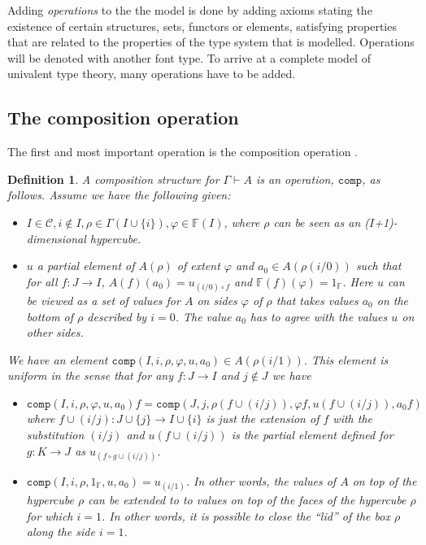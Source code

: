 \documentclass[11pt,a4paper,twoside,xetex,draft]{book}
\newcommand{\keyword}[1]{\emph{#1}\index{#1}}
\newtheorem{definition}[theorem]{Definition}
\newcommand{\op}[1]{\mathtt{#1}}
\begin{document}
Adding \keyword{operations} to the the model is done by adding axioms stating the existence of certain structures, sets, functors or elements, satisfying properties that are related to the properties of the type system that is modelled. Operations will be denoted with another font type. To arrive at a complete model of univalent type theory, many operations have to be added. 

\subsection{The composition operation}

The first and most important operation is the composition operation \cite{Orton2019}.

\begin{definition}
A \keyword{composition structure} for $\Gamma \vdash A$ is an operation, $\op{comp}$, as follows. Assume we have the following given:

\begin{itemize}
\item $I \in \mathcal{C}, i \not \in I, \rho \in \Gamma(I \cup \{i\}), \varphi \in \mathbb{F}(I)$, where $\rho$ can be seen as an ($I$+1)-dimensional hypercube.
\item $u$ a partial element of $A(\rho)$ of extent $\varphi$ and $a_0 \in A(\rho (i/0))$ such that for all $f:J\rightarrow I$, $A(f)(a_0) = u _{(i/0) \circ f}$ and $\mathbb{F}(f)(\varphi) = 1_{\mathbb{F}}$. Here $u$ can be viewed as a set of values for $A$ on sides $\varphi$ of $\rho$ that takes values $a_0$ on the bottom of $\rho$ described by $i=0$. The value $a_0$ has to agree with the values $u$ on other sides.
\end{itemize}

We have an element $\op{comp}(I,i,\rho,\varphi, u,a_0)\in A(\rho(i/1))$. This element is uniform in the sense that for any $f:J \rightarrow I$ and $j \not \in J$ we have 

\begin{itemize}
\item $\op{comp} \left(I,i,\rho,\varphi, u , a_0 \right) f = \op{comp}(J,j,\rho(f \cup (i/j)), \varphi f, u(f \cup (i/j)), a_0 f)$  where $f \cup (i/j): J \cup \{j\} \rightarrow I \cup \{i\}$ is just the extension of $f$ with the substitution $(i/j)$ and $u(f \cup (i/j))$ is the partial element defined for $g: K \rightarrow J$ as $u_{(f \circ g \cup (i/j))}$.

\item $\op{comp}(I,i,\rho, 1_{\mathbb{F}}, u, a_0) = u_{(i/1)}$. In other words, the values of $A$ on top of the hypercube $\rho$ can be extended to to values on top of the faces of the hypercube $\rho$ for which $i=1$. In other words, it is possible to close the ``lid'' of the box $\rho$ along the side $i=1$.

\end{itemize}



\end{definition}
\end{document}
